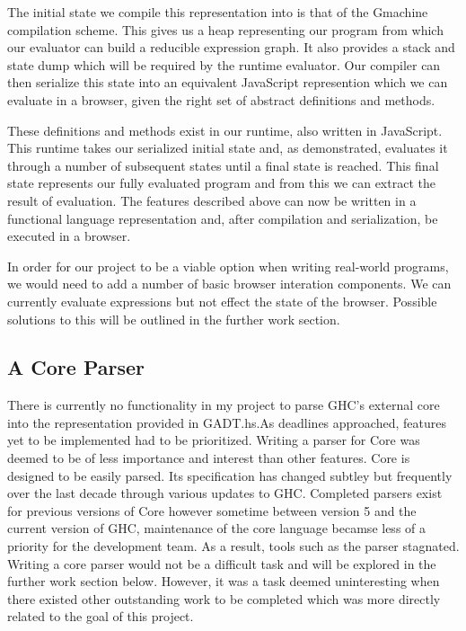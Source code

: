 The initial state we compile this representation into is that of
the Gmachine compilation scheme. This gives us a heap representing
our program from which our evaluator can build a reducible expression
graph. It also provides a stack and state dump which will be 
required by the runtime evaluator. Our compiler can then serialize
this state into an equivalent JavaScript represention which we can
evaluate in a browser, given the right set of abstract definitions
and methods.

These definitions and methods exist in our runtime, also written
in JavaScript. This runtime takes our serialized initial state
and, as demonstrated, evaluates it through a number of subsequent
states until a final state is reached. This final state represents
our fully evaluated program and from this we can extract the result
of evaluation. The features described above can now be written
in a functional language representation and, after compilation
and serialization, be executed in a browser. 

In order for our project to be a viable option when writing 
real-world programs, we would need to add a number of basic browser
interation components. We can currently evaluate expressions but
not effect the state of the browser. Possible solutions to this
will be outlined in the further work section.

\subsection{A Core Parser}
There is currently no functionality in my project to parse GHC's
external core into the representation provided in GADT.hs.As 
deadlines approached, features yet to be implemented had to be
prioritized. Writing a parser for Core was deemed to be of less
importance and interest than other features. Core is designed to
be easily parsed. Its specification has changed subtley but frequently
over the last decade through various updates to GHC. Completed
parsers exist for previous versions of Core however sometime between
version 5 and the current version of GHC, maintenance of the core
language becamse less of a priority for the development team. As
a result, tools such as the parser stagnated. Writing a core parser
would not be a difficult task and will be explored in the further
work section below. However, it was a task deemed uninteresting 
when there existed other outstanding work to be completed which was
more directly related to the goal of this project. 


